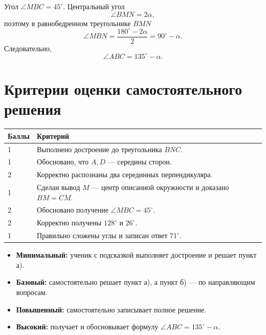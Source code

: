 \begin{answerbox}[Задание 8]
Угол \(\angle MBC=45^\circ\). Центральный угол
\[
\angle BMN=2\alpha,
\]
поэтому в равнобедренном треугольнике \(BMN\)
\[
\angle MBN=\frac{180^\circ-2\alpha}{2}=90^\circ-\alpha.
\]
Следовательно,
\[
\boxed{\angle ABC=135^\circ-\alpha}.
\]
\end{answerbox}

\section{Критерии оценки самостоятельного решения}

\begin{tabularx}{\linewidth}{@{}p{16mm}X@{}}
\toprule
Баллы & Критерий\\
\midrule
1 & Выполнено достроение до треугольника \(BNC\).\\
1 & Обосновано, что \(A,D\) — середины сторон.\\
2 & Корректно распознаны два серединных перпендикуляра.\\
1 & Сделан вывод \(M\) — центр описанной окружности и доказано \(BM=CM\).\\
2 & Обосновано получение \(\angle MBC=45^\circ\).\\
2 & Корректно получены \(128^\circ\) и \(26^\circ\).\\
1 & Правильно сложены углы и записан ответ \(71^\circ\).\\
\bottomrule
\end{tabularx}

\begin{teacherbox}
\begin{itemize}
  \item \textbf{Минимальный:} ученик с подсказкой выполняет достроение и
  решает пункт а).
  \item \textbf{Базовый:} самостоятельно решает пункт а), а пункт б) — по
  направляющим вопросам.
  \item \textbf{Повышенный:} самостоятельно записывает полное решение.
  \item \textbf{Высокий:} получает и обосновывает формулу
  \(\angle ABC=135^\circ-\alpha\).
\end{itemize}
\end{teacherbox}
